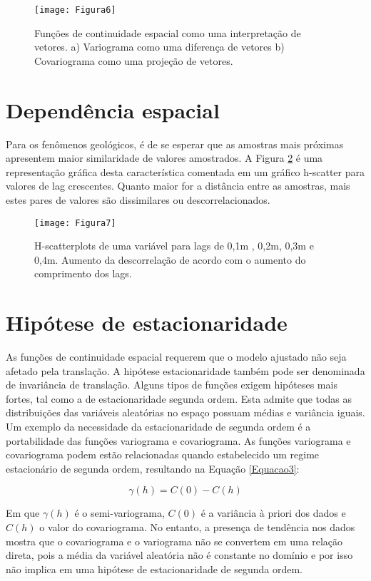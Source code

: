 \begin{figure}[!]
	\centering
	\texttt{[image: Figura6]}
	\caption{Funções de continuidade espacial como uma interpretação de vetores. a) Variograma como uma diferença de vetores b) Covariograma como uma projeção de vetores.}
	\label{Figura6}
\end{figure}

\section{Dependência espacial}

Para os fenômenos geológicos, é de se esperar que as amostras mais próximas apresentem maior similaridade de valores amostrados. A Figura \ref{Figura7} é uma representação gráfica desta característica comentada em um gráfico h-scatter para valores de lag crescentes. Quanto maior for a distância entre as amostras, mais estes pares de valores são dissimilares ou descorrelacionados.  

\begin{figure}[!]
	\centering
	\texttt{[image: Figura7]}
	\caption{H-scatterplots de uma variável para lags de 0,1m , 0,2m, 0,3m e 0,4m. Aumento da descorrelação de acordo com o aumento do comprimento dos lags.}
	\label{Figura7}
\end{figure}

\section{Hipótese de estacionaridade}

As funções de continuidade espacial requerem que o modelo ajustado não seja afetado pela translação. A hipótese estacionaridade também pode ser denominada de invariância de translação. Alguns tipos de funções exigem hipóteses mais fortes, tal como a de estacionaridade segunda ordem. Esta admite que todas as distribuições das variáveis aleatórias no espaço possuam médias e variância iguais. 
Um exemplo da necessidade da estacionaridade de segunda ordem é a portabilidade das funções variograma e covariograma. As funções variograma e covariograma podem estão relacionadas quando estabelecido um regime estacionário de segunda ordem, resultando na Equação \ref{Equacao3}:

\begin{equation}\label{Equacao3}
\gamma(h) = C(0) - C(h)
\end{equation}

Em que $\gamma(h)$ é o semi-variograma, $C(0)$ é a variância à priori dos dados e $C(h)$ o valor do covariograma.  No entanto, a presença de tendência nos dados mostra que o covariograma e o variograma não se convertem em uma relação direta, pois a média da variável aleatória não é constante no domínio e por isso não implica em uma hipótese de estacionaridade de segunda ordem. 

